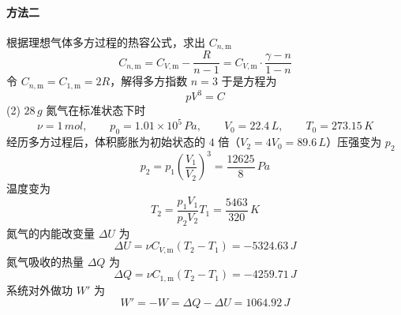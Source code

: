 \begin{solution}
    \paragraph{方法二}
    根据理想气体多方过程的热容公式，求出 $C_{n,\mathrm{m}}$
    $$
        C_{n,\mathrm{m}}
        = C_{V,\mathrm{m}} - \frac{R}{n-1}
        = C_{V,\mathrm{m}} \cdot \frac{\gamma-n}{1-n}
    $$
    令 $C_{n,\mathrm{m}} = C_{1,\mathrm{m}} = 2R$，解得多方指数 $n = 3$
    于是方程为
    $$
        pV^3 = C
    $$
    (2) $28 \,\si{g}$ 氮气在标准状态下时
    $$
        \nu = 1 \,\si{mol},
        \quad\quad
        p_0 = 1.01 \times 10^5 \,\si{Pa},
        \quad\quad
        V_0 = 22.4 \,\si{L},
        \quad\quad
        T_0 = 273.15\,\si{K}
    $$
    经历多方过程后，体积膨胀为初始状态的 $4$ 倍（$V_2 = 4V_0 = 89.6 \,\si{L}$）压强变为 $p_2$
    $$
        p_2 = p_1 \left(\frac{V_1}{V_2}\right)^3
        = \frac{12625}{8} \,\si{Pa}
    $$
    温度变为
    $$
        T_2 = \frac{p_1V_1}{p_2V_2}T_1 = \frac{5463}{320} \,\si{K}
    $$
    氮气的内能改变量 $\Delta U$ 为
    $$
        \Delta U
        = \nu C_{V,\mathrm{m}} (T_2 - T_1)
        = - 5324.63 \,\si{J}
    $$
    氮气吸收的热量 $\Delta Q$ 为
    $$
        \Delta Q
        = \nu C_{1,\mathrm{m}} (T_2 - T_1)
        = -4259.71 \,\si{J}
    $$
    系统对外做功 $W'$ 为
    $$
        W' = -W = \Delta Q - \Delta U = 1064.92 \,\si{J}
    $$
\end{solution}

